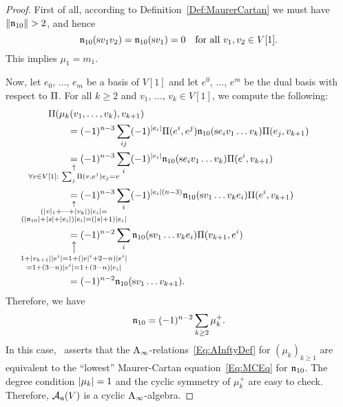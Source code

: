 \documentclass[\MainFolder/Text.tex]{subfiles}
\begin{document}
\begin{proof}
First of all, according to Definition~\ref{Def:MaurerCartan} we must have $\| \mathfrak{n}_{10} \| > 2$, and hence 
$$ \mathfrak{n}_{10}(\mathrm{s} v_1 v_2) = \mathfrak{n}_{10}(\mathrm{s} v_1) = 0 \quad\text{for all }v_1, v_2 \in V[1].  $$
This implies $\mu_1 = m_1$.

Now, let $e_0$, $\dotsc$, $e_m$ be a basis of $V[1]$ and let $e^0$, $\dotsc$, $e^m$ be the dual basis with respect to $\Pi$. For all $k\ge 2$ and $v_1$, $\dotsc$, $v_k \in V[1]$, we compute the following:
\allowdisplaybreaks
\begin{align*}
& \Pair(\mu_k(v_1,\dotsc,v_k),v_{k+1}) \\
&\qquad = (-1)^{n-3}\sum_{ij} (-1)^{\Abs{e_i}}\Pair(e^i, e^j) \PMC_{10}(\Susp e_i v_1\dots v_k) \Pair(e_j, v_{k+1}) \\
&\qquad  \underset{\mathclap{\substack{\uparrow\rule{0pt}{1.5ex}\\\forall v\in V[1]: \ \sum_j \Pair(v,e^j)e_j = v}}}{=} (-1)^{n-3}\sum_i (-1)^{\Abs{e_i}} \PMC_{10}(\Susp e_i v_1\dotsc v_k) \Pair(e^i,v_{k+1}) \\
&\qquad \underset{\mathclap{\substack{\uparrow\rule{0pt}{1.5ex}\\(\Abs{v}_1 + \dotsb + \Abs{v_k}) \Abs{e_i} = \\ (\Abs{\PMC_{10}} + \Abs{s}+\Abs{e_i})\Abs{e_i} = (\Abs{s}+1)\Abs{e_i}}}}{=} (-1)^{n-3}\sum_i (-1)^{\Abs{e_i}(n-3)} \PMC_{10}(\Susp v_1 \dotsc v_k e_i) \Pair(e^i,v_{k+1}) \\
&\qquad \underset{\mathclap{\substack{\big\uparrow\rule{0pt}{2.5ex}\\ 1+\Abs{v_{k+1}}\Abs{e^i} = 1+(\Abs{e}^i + 2 - n)\Abs{e^i} \\= 1+(3-n)\Abs{e^i} = 1+(3-n)\Abs{e_i}}}}{=}  (-1)^{n-2}\sum_i \PMC_{10}(\Susp v_1 \dotsc v_k e_i) \Pair(v_{k+1},e^i) \\
&\qquad = (-1)^{n-2}\PMC_{10}(\Susp v_1 \dotsc v_{k+1}).
\end{align*}
Therefore, we have
\begin{equation*}
 \mathfrak{n}_{10} = (-1)^{n-2}\sum_{k\ge 2} \mu_k^+.
\end{equation*}
In this case,~\cite[Proposition 12.3]{Cieliebak2015} asserts that the $\mathrm{A}_\infty$-relations~\eqref{Eq:AInftyDef} for $(\mu_k)_{k\ge 1}$ are equivalent to the ``lowest'' Maurer-Cartan equation~\eqref{Eq:MCEq} for $\mathfrak{n}_{10}$. 
The degree condition $|\mu_k|=1$ and the cyclic symmetry of $\mu_k^+$ are easy to check. Therefore, $\mathcal{A}_{\mathfrak{n}}(V)$ is a cyclic $\mathrm{A}_\infty$-algebra.


\end{proof}
\end{document}
